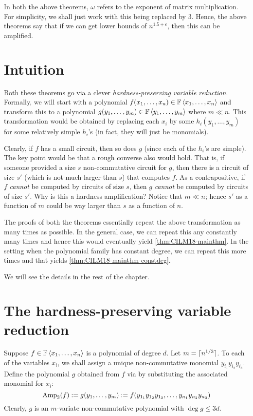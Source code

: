 In both the above theorems, $\omega$ refers to the exponent of matrix multiplication. For simplicity, we shall just work with this being replaced by $3$. Hence, the above theorems say that if we can get lower bounds of $n^{1.5 + \epsilon}$, then this can be amplified.

\section{Intuition}

Both these theorems go via a clever \emph{hardness-preserving variable reduction}. Formally, we will start with a polynomial $f(x_1,\ldots, x_n) \in \mathbb{F}\left\langle x_1,\ldots, x_n\right\rangle$ and transform this to a polynomial $g(y_1,\ldots, y_m) \in \mathbb{F}\left\langle y_1,\ldots, y_m\right\rangle$  where $m \ll n$. This transformation would be obtained by replacing each $x_i$ by some $h_i(y_1,\ldots, y_m)$ for some relatively simple $h_i$'s (in fact, they will just be monomials).

Clearly, if $f$ has a small circuit, then so does $g$ (since each of the $h_i$'s are simple). The key point would be that a rough converse also would hold. That is, if someone provided a size $s$ non-commutative circuit for $g$, then there is a circuit of size $s'$ (which is not-much-larger-than $s$) that computes $f$. As a contrapositive, if $f$ \emph{cannot} be computed by circuits of size $s$, then $g$ \emph{cannot} be computed by circuits of size $s'$. Why is this a hardness amplification? Notice that $m \ll n$; hence $s'$ as a function of $m$ could be way larger than $s$ as a function of $n$.

The proofs of both the theorems essentially repeat the above transformation as many times as possible. In the general case, we can repeat this any constantly many times and hence this would eventually yield \autoref{thm:CILM18-mainthm}. In the setting when the polynomial family has constant degree, we can repeat this more times and that yields \autoref{thm:CILM18-mainthm-constdeg}.

We will see the details in the rest of the chapter. 

\section{The hardness-preserving variable reduction}

Suppose $f \in \mathbb{F}\left\langle x_1,\ldots, x_n\right\rangle$ is a polynomial of degree $d$. Let $m = \lceil n^{1/3} \rceil$. To each of the variables $x_i$, we shall assign a unique non-commutative monomial $y_{i_1}y_{i_2}y_{i_3}$. Define the polynomial $g$ obtained from $f$ via by substituting the associated monomial for $x_i$:
\[
\operatorname{Amp}_3(f) :=  g(y_1,\dots, y_m) := f(y_{1_1}y_{1_2}y_{1_3}, \ldots, y_{n_1}y_{n_2}y_{n_3})
\]
Clearly, $g$ is an $m$-variate non-commutative polynomial with  $\deg g \leq 3 d$. 

